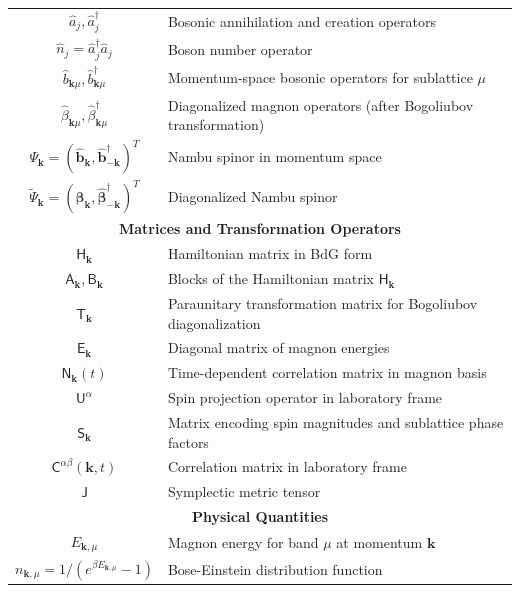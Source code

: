 \documentclass[aps, prx, nofootinbib, superscriptaddress]{revtex4-2}
\begin{document}
\begin{table}[t]
\begin{tabular}{c|l}
    \hline
    $\hat{a}_j, \hat{a}_j^{\dagger}$ & Bosonic annihilation and creation operators \\
    $\hat{n}_j = \hat{a}_j^{\dagger}\hat{a}_j$ & Boson number operator \\
    $\hat{b}_{\mathbf{k}\mu}, \hat{b}_{\mathbf{k}\mu}^{\dagger}$ & Momentum-space bosonic operators for sublattice $\mu$ \\
    $\hat{\beta}_{\mathbf{k}\mu}, \hat{\beta}_{\mathbf{k}\mu}^{\dagger}$ & Diagonalized magnon operators (after Bogoliubov transformation) \\
    $\Psi_{\mathbf{k}} = (\hat{\mathbf{b}}_{\mathbf{k}}, \hat{\mathbf{b}}_{-\mathbf{k}}^{\dagger})^T$ & Nambu spinor in momentum space \\
    $\widetilde{\Psi}_{\mathbf{k}} = (\hat{\boldsymbol{\beta}}_{\mathbf{k}}, \hat{\boldsymbol{\beta}}_{-\mathbf{k}}^{\dagger})^T$ & Diagonalized Nambu spinor \\
    \hline
    \multicolumn{2}{c}{\textbf{Matrices and Transformation Operators}} \\
    \hline
    $\mathsf{H}_{\mathbf{k}}$ & Hamiltonian matrix in BdG form \\
    $\mathsf{A}_{\mathbf{k}}, \mathsf{B}_{\mathbf{k}}$ & Blocks of the Hamiltonian matrix $\mathsf{H}_{\mathbf{k}}$ \\
    $\mathsf{T}_{\mathbf{k}}$ & Paraunitary transformation matrix for Bogoliubov diagonalization \\
    $\mathsf{E}_{\mathbf{k}}$ & Diagonal matrix of magnon energies \\
    $\mathsf{N}_{\mathbf{k}}(t)$ & Time-dependent correlation matrix in magnon basis \\
    $\mathsf{U}^{\alpha}$ & Spin projection operator in laboratory frame \\
    $\mathsf{S}_{\mathbf{k}}$ & Matrix encoding spin magnitudes and sublattice phase factors \\
    $\mathsf{C}^{\alpha\beta}(\mathbf{k}, t)$ & Correlation matrix in laboratory frame \\
    $\mathsf{J}$ & Symplectic metric tensor \\
    \hline
    \multicolumn{2}{c}{\textbf{Physical Quantities}} \\
    \hline
    $E_{\mathbf{k},\mu}$ & Magnon energy for band $\mu$ at momentum $\mathbf{k}$ \\
    $n_{\mathbf{k},\mu} = 1/(e^{\beta E_{\mathbf{k},\mu}}-1)$ & Bose-Einstein distribution function \\

\end{tabular}
\end{table}
\end{document}
